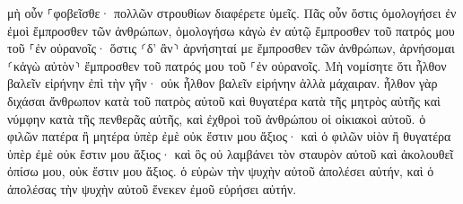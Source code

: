 \documentclass{openreader}
\begin{document}
μὴ οὖν ⸀φοβεῖσθε· πολλῶν στρουθίων διαφέρετε ὑμεῖς. 
Πᾶς οὖν ὅστις ὁμολογήσει ἐν ἐμοὶ ἔμπροσθεν τῶν ἀνθρώπων, ὁμολογήσω κἀγὼ ἐν αὐτῷ ἔμπροσθεν τοῦ πατρός μου τοῦ ⸀ἐν οὐρανοῖς· 
ὅστις ⸂δ’ ἂν⸃ ἀρνήσηταί με ἔμπροσθεν τῶν ἀνθρώπων, ἀρνήσομαι ⸂κἀγὼ αὐτὸν⸃ ἔμπροσθεν τοῦ πατρός μου τοῦ ⸀ἐν οὐρανοῖς. 
Μὴ νομίσητε ὅτι ἦλθον βαλεῖν εἰρήνην ἐπὶ τὴν γῆν· οὐκ ἦλθον βαλεῖν εἰρήνην ἀλλὰ μάχαιραν. 
ἦλθον γὰρ διχάσαι ἄνθρωπον κατὰ τοῦ πατρὸς αὐτοῦ καὶ θυγατέρα κατὰ τῆς μητρὸς αὐτῆς καὶ νύμφην κατὰ τῆς πενθερᾶς αὐτῆς, 
καὶ ἐχθροὶ τοῦ ἀνθρώπου οἱ οἰκιακοὶ αὐτοῦ. 
ὁ φιλῶν πατέρα ἢ μητέρα ὑπὲρ ἐμὲ οὐκ ἔστιν μου ἄξιος· καὶ ὁ φιλῶν υἱὸν ἢ θυγατέρα ὑπὲρ ἐμὲ οὐκ ἔστιν μου ἄξιος· 
καὶ ὃς οὐ λαμβάνει τὸν σταυρὸν αὐτοῦ καὶ ἀκολουθεῖ ὀπίσω μου, οὐκ ἔστιν μου ἄξιος. 
ὁ εὑρὼν τὴν ψυχὴν αὐτοῦ ἀπολέσει αὐτήν, καὶ ὁ ἀπολέσας τὴν ψυχὴν αὐτοῦ ἕνεκεν ἐμοῦ εὑρήσει αὐτήν. 
\end{document}
